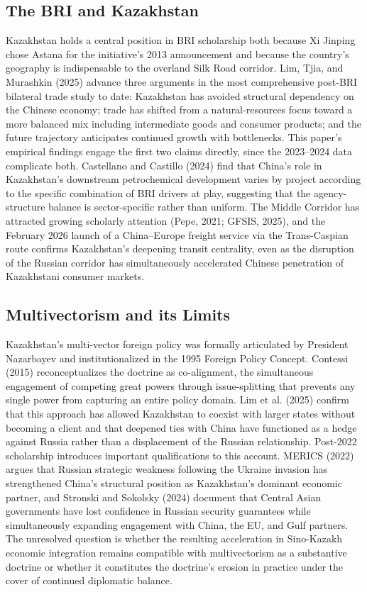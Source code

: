 \documentclass[12pt]{article}
\begin{document}
\subsection{The BRI and Kazakhstan}

Kazakhstan holds a central position in BRI scholarship both because Xi Jinping chose Astana for the initiative's 2013 announcement and because the country's geography is indispensable to the overland Silk Road corridor. Lim, Tjia, and Murashkin (2025) advance three arguments in the most comprehensive post-BRI bilateral trade study to date: Kazakhstan has avoided structural dependency on the Chinese economy; trade has shifted from a natural-resources focus toward a more balanced mix including intermediate goods and consumer products; and the future trajectory anticipates continued growth with bottlenecks. This paper's empirical findings engage the first two claims directly, since the 2023--2024 data complicate both. Castellano and Castillo (2024) find that China's role in Kazakhstan's downstream petrochemical development varies by project according to the specific combination of BRI drivers at play, suggesting that the agency-structure balance is sector-specific rather than uniform. The Middle Corridor has attracted growing scholarly attention (Pepe, 2021; GFSIS, 2025), and the February 2026 launch of a China--Europe freight service via the Trans-Caspian route confirms Kazakhstan's deepening transit centrality, even as the disruption of the Russian corridor has simultaneously accelerated Chinese penetration of Kazakhstani consumer markets.

\subsection{Multivectorism and its Limits}

Kazakhstan's multi-vector foreign policy was formally articulated by President Nazarbayev and institutionalized in the 1995 Foreign Policy Concept. Contessi (2015) reconceptualizes the doctrine as co-alignment, the simultaneous engagement of competing great powers through issue-splitting that prevents any single power from capturing an entire policy domain. Lim et al. (2025) confirm that this approach has allowed Kazakhstan to coexist with larger states without becoming a client and that deepened ties with China have functioned as a hedge against Russia rather than a displacement of the Russian relationship. Post-2022 scholarship introduces important qualifications to this account. MERICS (2022) argues that Russian strategic weakness following the Ukraine invasion has strengthened China's structural position as Kazakhstan's dominant economic partner, and Stronski and Sokolsky (2024) document that Central Asian governments have lost confidence in Russian security guarantees while simultaneously expanding engagement with China, the EU, and Gulf partners. The unresolved question is whether the resulting acceleration in Sino-Kazakh economic integration remains compatible with multivectorism as a substantive doctrine or whether it constitutes the doctrine's erosion in practice under the cover of continued diplomatic balance.
\end{document}

